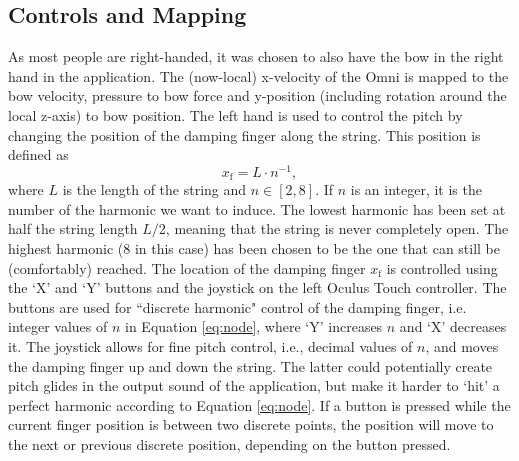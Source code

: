 \subsection{Controls and Mapping}\label{sec:controls}
As most people are right-handed, it was chosen to also have the bow in the right hand in the application. The (now-local) x-velocity of the Omni is mapped to the bow velocity, pressure to bow force and y-position (including rotation around the local z-axis) to bow position. The left hand is used to control the pitch by changing the position of the damping finger along the string. This position is defined as
\begin{equation}\label{eq:node}
    x_\text{f} = L\cdot n^{-1},
\end{equation}
%
where $L$ is the length of the string and $n \in [2,8]$. If $n$ is an integer, it is the number of the harmonic we want to induce. The lowest harmonic has been set at half the string length $L/2$, meaning that the string is never completely open. The highest harmonic (8 in this case) has been chosen to be the one that can still be (comfortably) reached. The location of the damping finger $x_\text{f}$ is controlled using the `X' and `Y' buttons and the joystick on the left Oculus Touch controller. %
The buttons are used for ``discrete harmonic" control of the damping finger, i.e. integer values of $n$ in Equation \eqref{eq:node}, where `Y' increases $n$ and `X' decreases it. The joystick allows for fine pitch control, i.e., decimal values of $n$, and moves the damping finger up and down the string. The latter could potentially create pitch glides in the output sound of the application, but make it harder to `hit' a perfect harmonic according to Equation \eqref{eq:node}. If a button is pressed while the current finger position is between two discrete points, the position will move to the next or previous discrete position, depending on the button pressed.
